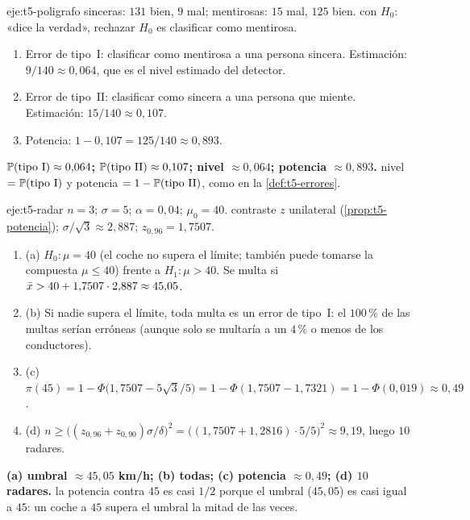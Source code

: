\begin{solucion}{eje:t5-poligrafo}
\datos sinceras: $131$ bien, $9$ mal; mentirosas: $15$ mal, $125$ bien.
\planteamiento con $H_0$: «dice la verdad», rechazar $H_0$ es clasificar como mentirosa.
\pasos
\begin{enumerate}[label=\arabic*.]
  \item Error de tipo~I: clasificar como mentirosa a una persona sincera. Estimación: $9/140\approx0{,}064$, que es el nivel estimado del detector.
  \item Error de tipo~II: clasificar como sincera a una persona que miente. Estimación: $15/140\approx0{,}107$.
  \item Potencia: $1-0{,}107=125/140\approx0{,}893$.
\end{enumerate}
\resultado \textbf{$\mathbb{P}(\text{tipo I})\approx0{,}064$; $\mathbb{P}(\text{tipo II})\approx0{,}107$; nivel $\approx0{,}064$; potencia $\approx0{,}893$.}
\comprobacion nivel $=\mathbb{P}(\text{tipo I})$ y potencia $=1-\mathbb{P}(\text{tipo II})$, como en la \cref{def:t5-errores}.
\end{solucion}

\begin{solucion}{eje:t5-radar}
\datos $n=3$; $\sigma=5$; $\alpha=0{,}04$; $\mu_0=40$.
\planteamiento contraste $z$ unilateral (\cref{prop:t5-potencia}); $\sigma/\sqrt3\approx2{,}887$; $z_{0{,}96}=1{,}7507$.
\pasos
\begin{enumerate}[label=\arabic*.]
  \item (a) $H_0:\mu=40$ (el coche no supera el límite; también puede tomarse la compuesta $\mu\le40$) frente a $H_1:\mu>40$. Se multa si $\bar{x}>40+1{,}7507\cdot2{,}887\approx45{,}05$.
  \item (b) Si nadie supera el límite, toda multa es un error de tipo~I: el $100\,\%$ de las multas serían erróneas (aunque solo se multaría a un $4\,\%$ o menos de los conductores).
  \item (c) $\pi(45)=1-\Phi\bigl(1{,}7507-5\sqrt3/5\bigr)=1-\Phi(1{,}7507-1{,}7321)=1-\Phi(0{,}019)\approx0{,}49$.
  \item (d) $n\ge\bigl((z_{0{,}96}+z_{0{,}90})\sigma/\delta\bigr)^{2}=\bigl((1{,}7507+1{,}2816)\cdot5/5\bigr)^{2}\approx9{,}19$, luego $10$ radares.
\end{enumerate}
\resultado \textbf{(a) umbral $\approx45{,}05$ km/h; (b) todas; (c) potencia $\approx0{,}49$; (d) $10$ radares.}
\comprobacion la potencia contra $45$ es casi $1/2$ porque el umbral ($45{,}05$) es casi igual a $45$: un coche a $45$ supera el umbral la mitad de las veces.
\end{solucion}


